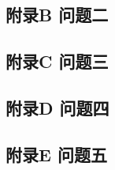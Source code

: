 \documentclass[a4paper, 12pt]{article}
\numberwithin{equation}{section}
\begin{document}
        \subsection*{附录B \hspace{2em} 问题二}
            

        \subsection*{附录C \hspace{2em} 问题三}

        \subsection*{附录D \hspace{2em} 问题四}

        \subsection*{附录E \hspace{2em} 问题五}
\end{document}
